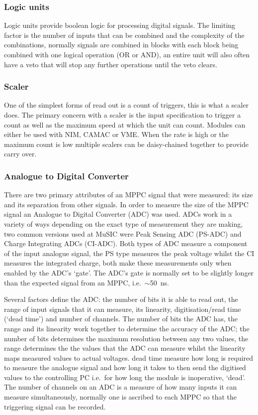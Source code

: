 \subsubsection{Logic units} %
\label{ssub:logic_units}
Logic units provide boolean logic for processing digital signals. The limiting factor is the number of inputs that can be combined and the complexity of the combinations, normally signals are combined in blocks with each block being combined with one logical operation (OR or AND), an entire unit will also often have a veto that will stop any further operations until the veto clears.

\subsubsection{Scaler} %
\label{ssub:scaler}
One of the simplest forms of read out is a count of triggers, this is what a scaler does. The primary concern with a scaler is the input specification to trigger a count as well as the maximum speed at which the unit can count. Modules can either be used with NIM, CAMAC or VME. When the rate is high or the maximum count is low multiple scalers can be daisy-chained together to provide carry over. 
\subsubsection{Analogue to Digital Converter} %
\label{ssub:analogue_to_digital_converter}
There are two primary attributes of an MPPC signal that were measured: its size and its separation from other signals. In order to measure the size of the MPPC signal an Analogue to Digital Converter (ADC) was used. ADCs work in a variety of ways depending on the exact type of measurement they are making, two common versions used at MuSIC were Peak Sensing ADC (PS-ADC) and Charge Integrating ADCs (CI-ADC). Both types of ADC measure a component of the input analogue signal, the PS type measures the peak voltage whilst the CI measures the integrated charge, both make these measurements only when enabled by the ADC's `gate'. The ADC's gate is normally set to be slightly longer than the expected signal from an MPPC, i.e.\ \( \sim \)50~ns. 

Several factors define the ADC: the number of bits it is able to read out, the range of input signals that it can measure, its linearity, digitisation/read time (`dead time') and number of channels. The number of bits the ADC has, the range and its linearity work together to determine the accuracy of the ADC; the number of bits determines the maximum resolution between any two values, the range determines the the values that the ADC can measure whilst the linearity maps measured values to actual voltages. dead time measure how long is required to measure the analogue signal and how long it takes to then send the digitised values to the controlling PC i.e.\ for how long the module is inoperative, `dead'. The number of channels on an ADC is a measure of how many inputs it can measure simultaneously, normally one is ascribed to each MPPC so that the triggering signal can be recorded.

